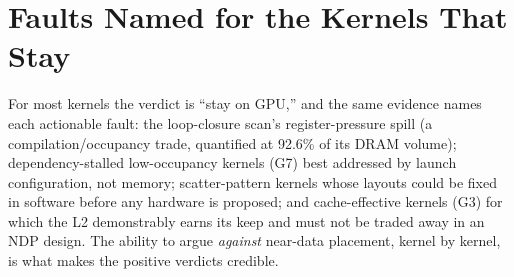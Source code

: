 \section{Faults Named for the Kernels That Stay}
\label{sec:syn-faults}

For most kernels the verdict is “stay on GPU,” and the same evidence names each actionable fault: the loop-closure scan’s register-pressure spill (a compilation/occupancy trade, quantified at 92.6\% of its DRAM volume); dependency-stalled low-occupancy kernels (G7) best addressed by launch configuration, not memory; scatter-pattern kernels whose layouts could be fixed in software before any hardware is proposed; and cache-effective kernels (G3) for which the L2 demonstrably earns its keep and must not be traded away in an NDP design. The ability to argue \emph{against} near-data placement, kernel by kernel, is what makes the positive verdicts credible.
